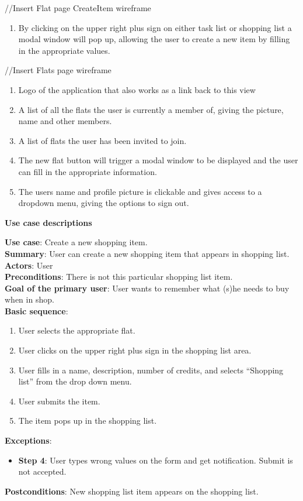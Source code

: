 \documentclass{sig-alt-release2}
\begin{document}
//Insert Flat page CreateItem wireframe
\begin{enumerate}
\item By clicking on the upper right plus sign on either task list or shopping list a modal window will pop up, allowing the user to create a new item by filling in the appropriate values.
\end{enumerate}

//Insert Flats page wireframe
\begin{enumerate}
\item Logo of the application that also works as a link back to this view
\item A list of all the flats the user is currently a member of, giving the picture, name and other members. 
\item A list of flats the user has been invited to join. 
\item The new flat button will trigger a modal window to be displayed and the user can fill in the appropriate information.
\item The users name and profile picture is clickable and gives access to a dropdown menu, giving the options to sign out.
\end{enumerate}

\textbf{Use case descriptions}

\textbf{Use case}: Create a new shopping item.\\
\textbf{Summary}: User can create a new shopping item that appears in shopping list.\\
\textbf{Actors}: User \\
\textbf{Preconditions}: There is not this particular shopping list item. \\
\textbf{Goal of the primary user}: User wants to remember what (s)he needs to buy when in shop. \\
\textbf{Basic sequence}:
\begin{enumerate}
\item User selects the appropriate flat.
\item User clicks on the upper right plus sign in the shopping list area. 
\item User fills in a name, description, number of credits, and selects “Shopping list” from the drop down menu. 
\item User submits the item.
\item The item pops up in the shopping list.
\end{enumerate}
\textbf{Exceptions}:
\begin{itemize}
\item \textbf{Step 4}: User types wrong values on the form and get notification. Submit is not accepted.
\end{itemize}
\textbf{Postconditions}: New shopping list item appears on the shopping list. \\
\end{document}
